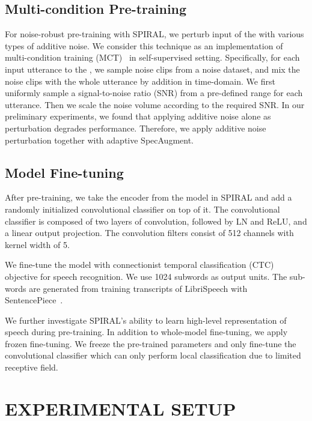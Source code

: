 \subsection{Multi-condition Pre-training}
For noise-robust pre-training with SPIRAL, we perturb input of the \student{} with various types of additive noise.
We consider this technique as an implementation of multi-condition training (MCT)~\citep{Seltzer2013} in self-supervised setting.
Specifically, for each input utterance to the \student{}, we sample noise clips from a noise dataset, and mix the noise clips with the whole utterance by addition in time-domain. We first uniformly sample a signal-to-noise ratio (SNR) from a pre-defined range for each utterance. Then we scale the noise volume according to the required SNR. In our preliminary experiments, we found that applying additive noise alone as perturbation degrades performance. Therefore, we apply additive noise perturbation together with adaptive SpecAugment.

\subsection{Model Fine-tuning}

After pre-training, we take the encoder from the \student{} model in SPIRAL and add a randomly initialized convolutional classifier on top of it.
The convolutional classifier is composed of two layers of convolution, followed by LN and ReLU, and a linear output projection.  The convolution filters consist of 512 channels with kernel width of 5.

We fine-tune the model with connectionist temporal classification (CTC)~\citep{Graves2006} objective for speech recognition.
We use 1024 subwords as output units. The sub-words are generated from training transcripts of LibriSpeech with SentencePiece~\citep{kudo2018sentencepiece}.

We further investigate SPIRAL's ability to learn high-level representation of speech during pre-training. In addition to whole-model fine-tuning, we apply frozen fine-tuning. We freeze the pre-trained parameters and only fine-tune the convolutional classifier which can only perform local classification due to limited receptive field.

\section{EXPERIMENTAL SETUP}
\label{experimental_setup}

